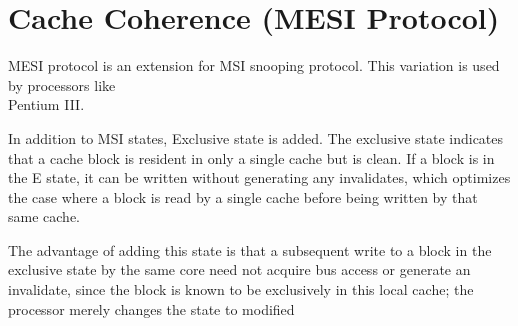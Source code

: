 \section{Cache Coherence (MESI Protocol)}
%


MESI protocol is an extension for MSI snooping protocol. This variation is used by processors like \\ Pentium III.

\noindent In addition to MSI states, Exclusive state is added.  The exclusive state indicates that
a cache block is resident in only a single cache but is clean. If a block is in
the E state, it can be written without generating any invalidates, which optimizes
the case where a block is read by a single cache before being written by that
same cache. 

\noindent The advantage of adding this state is that a subsequent
write to a block in the exclusive state by the same core need not acquire bus
access or generate an invalidate, since the block is known to be exclusively
in this local cache; the processor merely changes the state to modified

\vspace{1mm}

